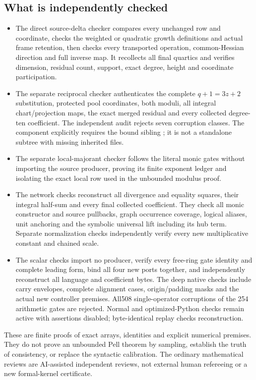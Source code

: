 \subsection{What is independently checked}
\begin{itemize}
\item The direct source-delta checker compares every unchanged row and
coordinate, checks the weighted or quadratic growth definitions and
actual frame retention, then checks every transported operation,
common-Hessian direction and full inverse map. It recollects all final
quartics and verifies dimension, residual count, support, exact degree,
height and coordinate participation.
\item The separate reciprocal checker authenticates the complete
$q+1=3z+2$ substitution, protected pool coordinates, both moduli,
all integral chart/projection maps, the exact merged residual and every
collected degree-ten coefficient. The independent audit rejects seven
corruption classes. The component  explicitly
requires the bound sibling ; it is not a standalone
subtree with missing inherited files.
\item The separate local-majorant checker follows the literal monic gates
without importing the source producer, proving its finite exponent ledger
and isolating the exact local row used in the unbounded modulus proof.
\item The network checks reconstruct all divergence and equality squares,
their integral half-sum and every final collected coefficient. They check
all monic constructor and source pullbacks, graph occurrence coverage,
logical aliases, unit anchoring and the symbolic universal lift including
its hub term. Separate normalization checks independently verify every
new multiplicative constant and chained scale.
\item The scalar checks import no producer, verify every free-ring gate
identity and complete leading form, bind all four new ports together,
and independently reconstruct all language and coefficient bytes.
The deep native checks include carry envelopes, complete alignment
cases, origin/padding masks and the actual new controller premises.
All508 single-operator corruptions of the 254 arithmetic gates are
rejected. Normal and optimized-Python checks remain active with
assertions disabled; byte-identical replay checks reconstruction.
\end{itemize}
These are finite proofs of exact arrays, identities and explicit numerical
premises. They do not prove an unbounded Pell theorem by sampling,
establish the truth of consistency, or replace the syntactic calibration.
The ordinary mathematical reviews are AI-assisted independent reviews,
not external human refereeing or a new formal-kernel certificate.

